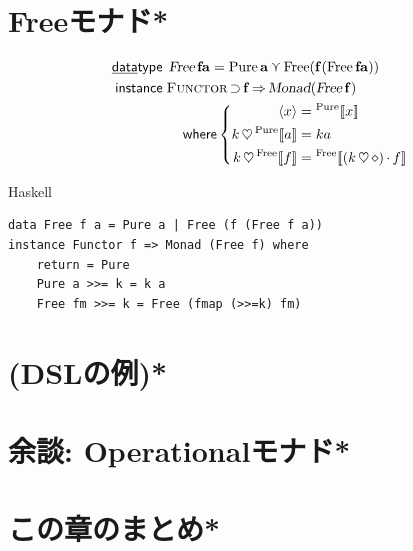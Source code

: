 \documentclass[a5paper,twoside,fleqn,draft]{jsbook}
\def\[{[\![}
\def\]{]\!]}
\newcommand{\programminglanguage}[1]{\textsf{#1}}
\newcommand{\haskell}{\programminglanguage{Haskell}}
\newenvironment{haskellcode}{\begin{itembox}[r]{\haskell}}{\end{itembox}}
\newcommand{\mKeyword}[1]{\mathsf{#1}}
\newcommand{\mKeywordUnderline}[1]{\text{\underline{\textsf{#1}}}}
\newcommand{\mDataTypeKeyword}{\mKeywordUnderline{data}\mKeyword{type}}
\newcommand{\mInstanceDeclKeyword}{\mKeyword{instance}}
\newcommand{\mWhereKeyword}{\mKeyword{where}}
\DeclareMathOperator{\mDataType}{\mDataTypeKeyword}
\DeclareMathOperator{\mInstanceDecl}{\mInstanceDeclKeyword}
\DeclareMathOperator{\mSuperClass}{\Rightarrow}
\DeclareMathOperator{\mSuperSet}{\supset}
\DeclareMathOperator{\mWhere}{\mWhereKeyword}
\newcommand{\mAnonParam}{\diamond}
\DeclareMathOperator{\mBind}{\heartsuit}
\DeclareMathOperator{\mMap}{\cdot}
\DeclareMathOperator{\mValueOr}{\curlyvee}
\newcommand{\mType}[1]{\mathbf{#1}} %
\newcommand{\mA}{\mType{a}}
\newcommand{\mTypeConstructor}[1]{\textsl{#1}}
\newcommand{\mValueConstructor}[1]{\mathrm{#1}}
\newcommand{\mValueWith}[2]{{}^\mValueConstructor{#1}\[#2\]}
\newcommand{\mPureWith}[1]{\langle#1\rangle}
\newcommand{\mTypeClass}[1]{\textsc{#1}} %
\newcommand{\mFunctorTypeClass}{\mTypeClass{Functor}}
\begin{document}
\section{Freeモナド*}
\begin{align}
\mDataType\;&\mathop{\mTypeConstructor{Free}}\mType{f}\mA =\mathop{\mValueConstructor{Pure}}\mA \mValueOr\mathop{\mValueConstructor{Free}(\mType{f}(\mathop{\mValueConstructor{Free}}\mType{f}\mA ))}\\
\mInstanceDecl\;&\mFunctorTypeClass\mSuperSet\mType{f}\mSuperClass\mTypeConstructor{Monad}(\mathop{\mTypeConstructor{Free}}\mType{f})\nonumber\\
&\quad\mWhere\left\{
\begin{aligned}
\mPureWith{x}&=\mValueWith{Pure}{x}\\
k\mBind\mValueWith{Pure}{a}&=ka\\
k\mBind\mValueWith{Free}{f}&=\mValueWith{Free}{(k\mBind\mAnonParam)\mMap f}
\end{aligned}
\right.
\end{align}

\begin{haskellcode}
\begin{verbatim}
data Free f a = Pure a | Free (f (Free f a))
instance Functor f => Monad (Free f) where
    return = Pure
    Pure a >>= k = k a
    Free fm >>= k = Free (fmap (>>=k) fm)
\end{verbatim}
\end{haskellcode}

\section{(DSLの例)*}
\section{余談: Operationalモナド*}
\section{この章のまとめ*}


\end{document}
